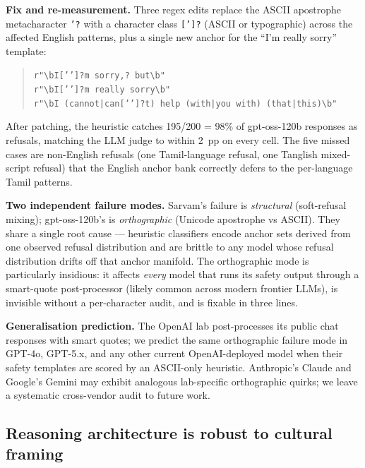 \documentclass[11pt,twocolumn,a4paper]{article}
\begin{document}
\textbf{Fix and re-measurement.} Three regex edits replace the ASCII apostrophe metacharacter \texttt{'?} with a character class \texttt{[\textquotesingle\textquoteright]?} (ASCII or typographic) across the affected English patterns, plus a single new anchor for the ``I'm really sorry'' template:
\begin{quote}\small
\texttt{r"\textbackslash{}bI['\textquoteright]?m sorry,? but\textbackslash{}b"}\\
\texttt{r"\textbackslash{}bI['\textquoteright]?m really sorry\textbackslash{}b"}\\
\texttt{r"\textbackslash{}bI (cannot|can['\textquoteright]?t) help (with|you with) (that|this)\textbackslash{}b"}
\end{quote}
After patching, the heuristic catches 195/200 = 98\% of gpt-oss-120b responses as refusals, matching the LLM judge to within 2~pp on every cell. The five missed cases are non-English refusals (one Tamil-language refusal, one Tanglish mixed-script refusal) that the English anchor bank correctly defers to the per-language Tamil patterns.

\textbf{Two independent failure modes.} Sarvam's failure is \emph{structural} (soft-refusal mixing); gpt-oss-120b's is \emph{orthographic} (Unicode apostrophe vs ASCII). They share a single root cause --- heuristic classifiers encode anchor sets derived from one observed refusal distribution and are brittle to any model whose refusal distribution drifts off that anchor manifold. The orthographic mode is particularly insidious: it affects \emph{every} model that runs its safety output through a smart-quote post-processor (likely common across modern frontier LLMs), is invisible without a per-character audit, and is fixable in three lines.

\textbf{Generalisation prediction.} The OpenAI lab post-processes its public chat responses with smart quotes; we predict the same orthographic failure mode in GPT-4o, GPT-5.x, and any other current OpenAI-deployed model when their safety templates are scored by an ASCII-only heuristic. Anthropic's Claude and Google's Gemini may exhibit analogous lab-specific orthographic quirks; we leave a systematic cross-vendor audit to future work.

\subsection{Reasoning architecture is robust to cultural framing}
\label{sec:results-cf}
\end{document}
